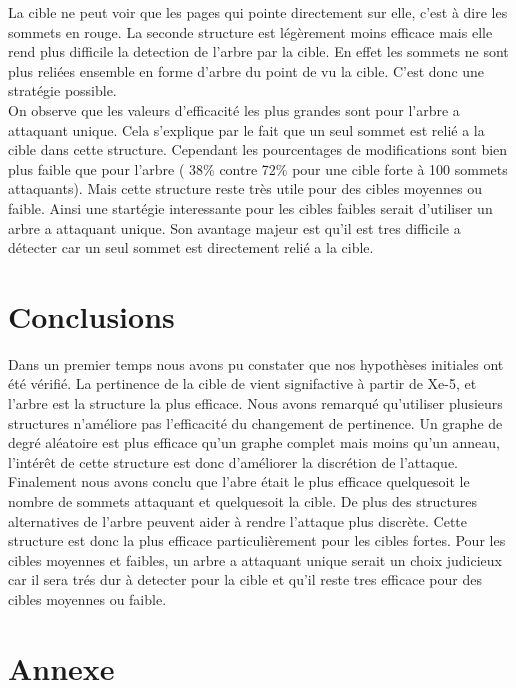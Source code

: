 \documentclass[a4paper,11pt]{article}
\begin{document}
		La cible ne peut voir que les pages qui pointe directement sur elle, c'est à dire les sommets en rouge.
		La seconde structure est légèrement moins efficace mais elle rend plus difficile la detection de l'arbre par la cible. En effet les sommets ne sont plus reliées ensemble en forme d'arbre du point de vu la cible.
		C'est donc une stratégie possible.\\
		
		On observe que les valeurs d'efficacité les plus grandes sont pour l'arbre a attaquant unique. Cela s'explique par le fait que un seul sommet est relié a la cible dans cette structure.
		Cependant les pourcentages de modifications sont bien plus faible que pour l'arbre ( 38\% contre 72\% pour une cible forte à 100 sommets attaquants).
		Mais cette structure reste très utile pour des cibles moyennes ou faible. Ainsi une startégie interessante pour les cibles faibles serait d'utiliser un arbre a attaquant unique.
		Son avantage majeur est qu'il est tres difficile a détecter car un seul sommet est directement relié a la cible.\\
	
\section{Conclusions}
	Dans un premier temps nous avons pu constater que nos hypothèses initiales ont été vérifié. La pertinence de la cible de vient signifactive à partir de Xe-5, et l'arbre est la structure la plus efficace. Nous avons remarqué qu'utiliser plusieurs structures n'améliore pas l'efficacité du changement de pertinence. Un graphe de degré aléatoire est plus efficace qu'un graphe complet mais moins qu'un anneau, l'intérêt de cette structure est donc d'améliorer la discrétion de l'attaque. Finalement nous avons conclu que l'abre était le plus efficace quelquesoit le nombre de sommets attaquant et quelquesoit la cible. De plus des structures alternatives de l'arbre peuvent aider à rendre l'attaque plus discrète. Cette structure est donc la plus efficace particulièrement pour les cibles fortes. Pour les cibles moyennes et faibles, un arbre a attaquant unique serait un choix judicieux car il sera trés dur à detecter pour la cible et qu'il reste tres efficace pour des cibles moyennes ou faible.

\section{Annexe}
		
		
		

		
\end{document}
